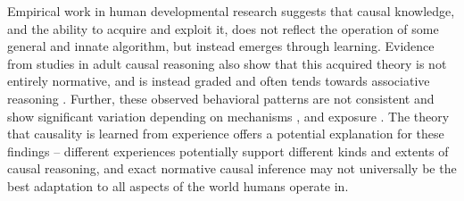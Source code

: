 Empirical work in human developmental research suggests that causal knowledge, and the ability to acquire and exploit it, does not reflect the operation of some general and innate algorithm, but instead emerges through learning\citep{saxe2006perception, meltzoff2007infants, bonawitz2010just, carey2009origin}. Evidence from studies in adult causal reasoning also show that this acquired theory is not entirely normative, and is instead graded and often tends towards associative reasoning \citep{rehder2014independence, rehder2017failures, fernbach2010neglect, fernbach2013cognitive}. Further, these observed behavioral patterns are not consistent and show significant variation depending on mechanisms \citep{lombrozo2010causal}, and exposure \citep{krynski2007role}. The theory that causality is learned from experience offers a potential explanation for these findings -- different experiences potentially support different kinds and extents of causal reasoning, and exact normative causal inference may not universally be the best adaptation to all aspects of the world humans operate in.



